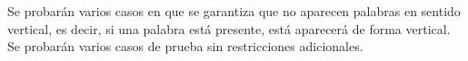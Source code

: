 \documentclass{oci}
\begin{document}
\begin{scoreDescription}
   Se probarán varios casos en que se garantiza que no aparecen palabras en sentido
  vertical, es decir, si una palabra está presente, está aparecerá de forma vertical.
   Se probarán varios casos de prueba sin restricciones adicionales.
\end{scoreDescription}

\begin{sampleDescription}
\end{sampleDescription}
\end{document}
